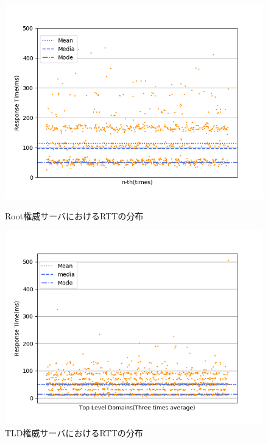 \begin{figure}[h]
 \centering
 \includegraphics[scale=0.8]{figure/root-rtt.png}
 \vspace{-1cm}
 \caption{Root権威サーバにおけるRTTの分布}
 \label{fig:root-rtt}
 \includegraphics[scale=0.8]{figure/average_rtt.png}
 \vspace{-1cm}
 \caption{TLD権威サーバにおけるRTTの分布}
 \label{fig:tld-rtt}
\end{figure}

